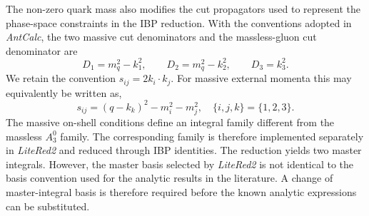 The non-zero quark mass also modifies the cut propagators used to represent the phase-space
constraints in the IBP reduction. With the conventions adopted in \textit{AntCalc}, the two
massive cut denominators and the massless-gluon cut denominator are
\begin{equation}
    D_1 = m_q^2-k_1^2,\qquad D_2 = m_q^2-k_2^2,\qquad D_3 = k_3^2.
\end{equation}
We retain the convention $s_{ij}=2k_i\cdot k_j$. For massive external momenta this may
equivalently be written as,
\begin{equation}
    s_{ij} = (q-k_k)^2 - m_i^2 - m_j^2,\quad \{i,j,k\}=\{1,2,3\}.
\end{equation}
The massive on-shell conditions define an integral family different from the massless $A_3^0$
family. The corresponding family is therefore implemented separately in \textit{LiteRed2} and
reduced through IBP identities. The reduction yields two master integrals. However, the master
basis selected by \textit{LiteRed2} is not identical to the basis convention used for the
analytic results in the literature. A change of master-integral basis is therefore required
before the known analytic expressions can be substituted.

